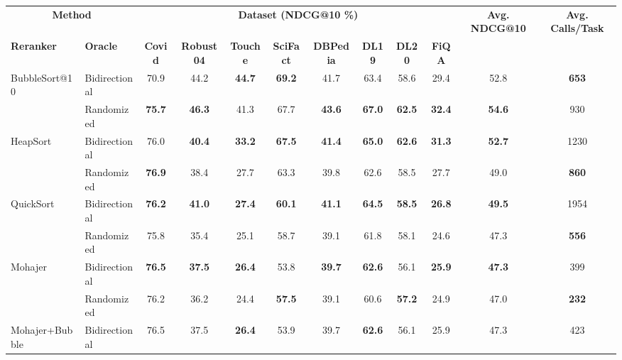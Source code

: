 \documentclass[11pt]{article}
\begin{document}
\begin{table}[!t]
\centering
\footnotesize
\setlength{\tabcolsep}{3pt}
\renewcommand{\arraystretch}{1.12}
\begin{adjustbox}{max width=\textwidth}
\begin{tabular}{llcccccccccc}
\toprule
\multicolumn{2}{c}{\textbf{Method}} &
\multicolumn{8}{c}{\textbf{Dataset (NDCG@10 \%)}} &
\textbf{Avg. NDCG@10} & \textbf{Avg. Calls/Task} \\
\cmidrule(lr){1-2}\cmidrule(lr){3-10}\cmidrule(lr){11-12}
\textbf{Reranker} & \textbf{Oracle} &
\textbf{Covid} & \textbf{Robust04} & \textbf{Touche} & \textbf{SciFact} &
\textbf{DBPedia} & \textbf{DL19} & \textbf{DL20} & \textbf{FiQA} & & \\
\midrule
\multirow{2}{*}{BubbleSort@10} & Bidirectional
& 70.9 & 44.2 & \textbf{44.7} & \textbf{69.2} & 41.7 & 63.4 & 58.6 & 29.4 & 52.8 & \textbf{653} \\
& Randomized
& \textbf{75.7} & \textbf{46.3} & 41.3 & 67.7 & \textbf{43.6} & \textbf{67.0} & \textbf{62.5} & \textbf{32.4} & \textbf{54.6} & 930 \\
\midrule
\multirow{2}{*}{HeapSort} & Bidirectional
& 76.0 & \textbf{40.4} & \textbf{33.2} & \textbf{67.5} & \textbf{41.4} & \textbf{65.0} & \textbf{62.6} & \textbf{31.3} & \textbf{52.7} & 1230 \\
& Randomized
& \textbf{76.9} & 38.4 & 27.7 & 63.3 & 39.8 & 62.6 & 58.5 & 27.7 & 49.0 & \textbf{860} \\
\midrule
\multirow{2}{*}{QuickSort} & Bidirectional
& \textbf{76.2} & \textbf{41.0} & \textbf{27.4} & \textbf{60.1} & \textbf{41.1} & \textbf{64.5} & \textbf{58.5} & \textbf{26.8} & \textbf{49.5} & 1954 \\
& Randomized
& 75.8 & 35.4 & 25.1 & 58.7 & 39.1 & 61.8 & 58.1 & 24.6 & 47.3 & \textbf{556} \\
\midrule
\multirow{2}{*}{Mohajer} & Bidirectional
& \textbf{76.5} & \textbf{37.5} & \textbf{26.4} & 53.8 & \textbf{39.7} & \textbf{62.6} & 56.1 & \textbf{25.9} & \textbf{47.3} & 399 \\
& Randomized
& 76.2 & 36.2 & 24.4 & \textbf{57.5} & 39.1 & 60.6 & \textbf{57.2} & 24.9 & 47.0 & \textbf{232} \\
\midrule
\multirow{2}{*}{Mohajer+Bubble} & Bidirectional
& 76.5 & 37.5 & \textbf{26.4} & 53.9 & 39.7 & \textbf{62.6} & 56.1 & 25.9 & 47.3 & 423 \\

\end{tabular}
\end{adjustbox}
\end{table}
\end{document}

